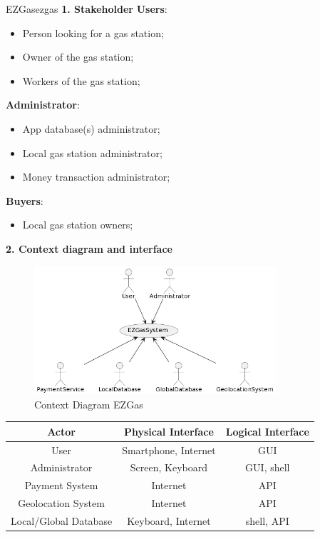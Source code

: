 \documentclass[12pt]{article}
\begin{document}
\begin{example}{EZGas}{ezgas}
  \textbf{1. Stakeholder}
  \textbf{Users}: 
  \begin{itemize}
    \item Person looking for a gas station;
    \item Owner of the gas station;
    \item Workers of the gas station;
  \end{itemize}
  \textbf{Administrator}:
  \begin{itemize}
    \item App database(s) administrator;
    \item Local gas station administrator;
    \item Money transaction administrator;
  \end{itemize}
  \textbf{Buyers}: 
  \begin{itemize}
    \item Local gas station owners;
  \end{itemize}
  \textbf{2. Context diagram and interface}
  \begin{figure}[H]
    \centering
    \includegraphics[width=0.8\textwidth]{context-diagram-ezgas.png}
    \caption{Context Diagram EZGas}
    \label{fig:context-diagram-ezgas}
  \end{figure}
  \begin{table}[H]
    \centering
    \begin{tabular}{|c|c|c|}
      \hline
      \textbf{Actor} & \textbf{Physical Interface} & \textbf{Logical Interface} \\
      \hline
      User & Smartphone, Internet & GUI \\
      \hline
      Administrator & Screen, Keyboard & GUI, shell \\
      \hline
      Payment System & Internet & API \\
      \hline
      Geolocation System & Internet & API \\
      \hline
      Local/Global Database & Keyboard, Internet & shell, API \\

\end{tabular}
\end{table}
\end{example}
\end{document}
